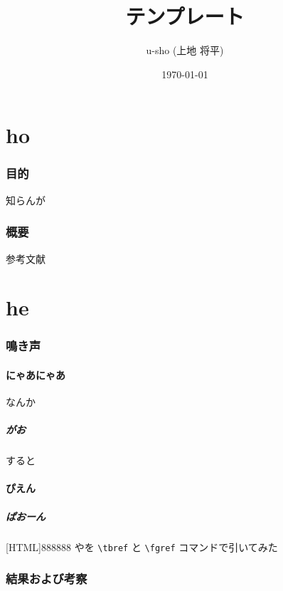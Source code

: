 \documentclass[uplatex,dvipdfmx]{u-sho_jsarticle}
\title{\upLaTeXe テンプレート} %
\author{u-sho (上地 将平)}
\date{\和暦\today}
\begin{document}
  \maketitle
  \tableofcontents

  \clearpage

  \part{ho}
    \section{目的}
      知らんが

    \section{概要}
      参考文献~\cite{キー1}

  \part{he}
    \section{鳴き声} %

      \subsection{にゃあにゃあ}
        なんか

      \subsubsection{\texorpdfstring{がお}{がおがお}}
        すると

      \subsection{ぴえん} %

      \subsubsection{ぱおーん}
        [HTML]{888888}{}
        やを \verb|\tbref| と \verb|\fgref| コマンドで引いてみた

  \newpage

    \section{結果および考察}
\end{document}
